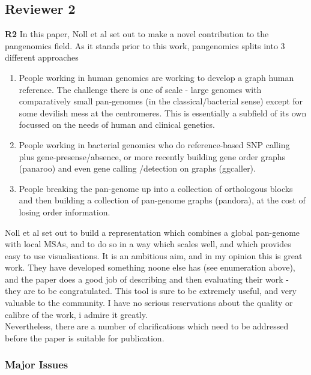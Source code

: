 \documentclass[aps,rmp,onecolumn]{revtex4-1}
\newcommand{\review}[1]{\textbf{#1}}
\begin{document}
\subsection*{Reviewer 2}

\review{R2} In this paper, Noll et al set out to make a novel contribution to the pangenomics field. As it stands prior to this work, pangenomics splits into 3 different approaches

\begin{enumerate}
      \item People working in human genomics are working to develop a graph human reference. The challenge there is one of scale - large genomes with comparatively small pan-genomes (in the classical/bacterial sense) except for some devilish mess at the centromeres. This is essentially a subfield of its own focussed on the needs of human and clinical genetics.

      \item People working in bacterial genomics who do reference-based SNP calling plus gene-presense/absence, or more recently building gene order graphs (panaroo) and even gene calling /detection on graphs (ggcaller).

      \item People breaking the pan-genome up into a collection of orthologous blocks and then building a collection of pan-genome graphs (pandora), at the cost of losing order information.
\end{enumerate}


Noll et al set out to build a representation which combines a global pan-genome with local MSAs, and to do so in a way which scales well, and which provides easy to use visualisations. It is an ambitious aim, and in my opinion this is great work. They have developed something noone else has (see enumeration above), and the paper does a good job of describing and then evaluating their work - they are to be congratulated. This tool is sure to be extremely useful, and very valuable to the community. I have no serious reservations about the quality or calibre of the work, i admire it greatly.\\

Nevertheless, there are a number of clarifications which need to be addressed before the paper is suitable for publication.\\

\subsubsection*{Major Issues}
\end{document}
